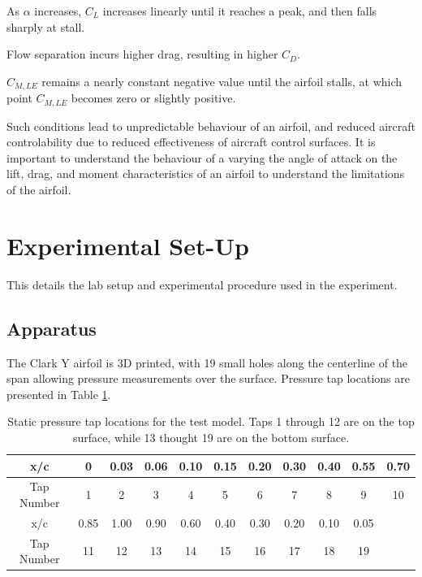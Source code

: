 \documentclass[runningheads]{llncs}
\begin{document}
\noindent
As $\alpha$ increases, $C_L$ increases linearly until it reaches a peak, and then falls sharply at stall.\newline

\noindent
Flow separation incurs higher drag, resulting in higher $C_D$.\newline

\noindent
$C_{M, LE}$ remains a nearly constant negative value until the airfoil stalls, at which point $C_{M, LE}$ becomes zero or slightly positive.\newline

\noindent
Such conditions lead to unpredictable behaviour of an airfoil, and reduced aircraft controlability due to reduced effectiveness of aircraft control surfaces. It is important to understand the behaviour of a varying the angle of attack on the lift, drag, and moment characteristics of an airfoil to understand the limitations of the airfoil.




\section{Experimental Set-Up}

\noindent
This details the lab setup and experimental procedure used in the experiment.

\subsection{Apparatus}

\noindent
The Clark Y airfoil is 3D printed, with 19 small holes along the centerline of the span allowing pressure measurements over the surface. Pressure tap locations are presented in Table \ref{tab:pressure_taps}.\newline

\begin{table}
    \centering
    \begin{tabular}{|c||c|c|c|c|c|c|c|c|c|c|}\hline
        x/c & 0 & 0.03 & 0.06 & 0.10 & 0.15 & 0.20 & 0.30 & 0.40 & 0.55 & 0.70 \\\hline
        Tap Number & 1 & 2 & 3 & 4 & 5 & 6 & 7 & 8 & 9 & 10\\\hline \hline
        x/c & 0.85 & 1.00 & 0.90 & 0.60 & 0.40 & 0.30 & 0.20 & 0.10 & 0.05&\\\hline
        Tap Number & 11 & 12 & 13 & 14 & 15 & 16 & 17 & 18 & 19&\\\hline
    \end{tabular}
    \caption{Static pressure tap locations for the test model. Taps 1 through 12 are on the top surface, while 13 thought 19 are on the bottom surface.}
    \label{tab:pressure_taps}
\end{table}
\end{document}
